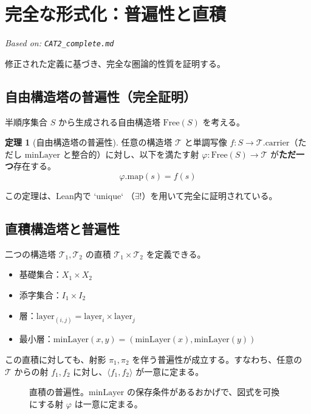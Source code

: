 \documentclass[a4paper,11pt]{ltjsarticle}
\theoremstyle{definition}
\newtheorem{theorem}[definition]{定理}
\newcommand{\Tower}{\mathcal{T}}
\newcommand{\Layer}[1]{\mathrm{layer}_{#1}}
\newcommand{\MinLayer}{\mathrm{minLayer}}
\begin{document}
\section{完全な形式化：普遍性と直積}
\label{sec:cat2_complete}
\textit{Based on: \texttt{CAT2\_complete.md}}

修正された定義に基づき、完全な圏論的性質を証明する。

\subsection{自由構造塔の普遍性（完全証明）}
半順序集合 $S$ から生成される自由構造塔 $\text{Free}(S)$ を考える。
\begin{theorem}[自由構造塔の普遍性]
任意の構造塔 $\Tower$ と単調写像 $f: S \to \Tower.\text{carrier}$（ただし $\MinLayer$ と整合的）に対し、以下を満たす射 $\varphi: \text{Free}(S) \to \Tower$ が\textbf{ただ一つ}存在する。
\[ \varphi.\text{map}(s) = f(s) \]
\end{theorem}
この定理は、Lean内で `unique` （$\exists !$）を用いて完全に証明されている。

\subsection{直積構造塔と普遍性}
二つの構造塔 $\Tower_1, \Tower_2$ の直積 $\Tower_1 \times \Tower_2$ を定義できる。
\begin{itemize}
    \item 基礎集合：$X_1 \times X_2$
    \item 添字集合：$I_1 \times I_2$
    \item 層：$\Layer{(i,j)} = \Layer{i} \times \Layer{j}$
    \item 最小層：$\MinLayer(x, y) = (\MinLayer(x), \MinLayer(y))$
\end{itemize}

この直積に対しても、射影 $\pi_1, \pi_2$ を伴う普遍性が成立する。すなわち、任意の $\Tower$ からの射 $f_1, f_2$ に対し、$\langle f_1, f_2 \rangle$ が一意に定まる。

\begin{figure}[h]
\centering
{}
\caption{直積の普遍性。$\MinLayer$ の保存条件があるおかげで、図式を可換にする射 $\varphi$ は一意に定まる。}
\end{figure}
\end{document}
